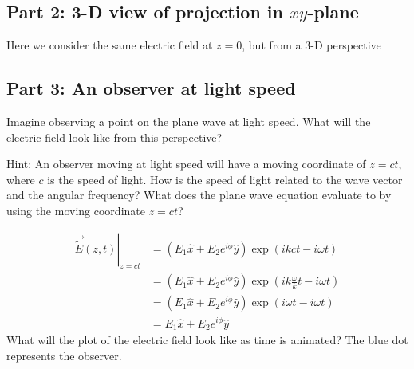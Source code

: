 \documentclass{article}
\begin{document}
\subsection{Part 2: 3-D view of projection in $xy$-plane}
Here we consider the same electric field at $z=0$, but from a 3-D perspective

\subsection{Part 3: An observer at light speed}
Imagine observing a point on the plane wave at light speed.  What will the electric field look like from this perspective?

Hint: An observer moving at light speed will have a moving coordinate of $z=ct$, where $c$ is the speed of light.  How is the speed of light related to the wave vector and the angular frequency?  What does the plane wave equation evaluate to by using the moving coordinate $z=ct$?

\begin{align}
     \left.\vec{\widetilde{E}}\left(z,t\right)\right\rvert_{z=ct} &= \left(E_1\hat{x} + E_2e^{i\phi}\hat{y}\right) \exp \left(ikct- i \omega t\right)  \\
     &= \left(E_1\hat{x} + E_2e^{i\phi}\hat{y}\right) \exp \left(ik\frac{\omega}{k}t - i \omega t\right) \\
     &= \left(E_1\hat{x} + E_2e^{i\phi}\hat{y}\right) \exp \left(i\omega t- i \omega t\right)   \\
     &= E_1\hat{x} + E_2e^{i\phi}\hat{y} 
\end{align}
What will the plot of the electric field look like as time is animated?  The blue dot represents the observer.
\end{document}
